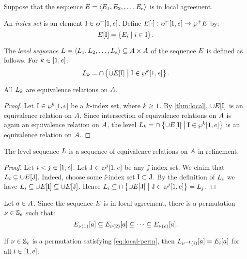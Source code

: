 Suppose that the sequence
$E = \left\langle E_{1}, E_{2}, \dots, E_{e} \right\rangle$ is in local agreement.
\begin{definition}
An \emph{index set} is an element $\mathrm{I} \in \wp^{+}{[}1, e]$.
Define $E[\cdot] : \wp^{+}{[}1, e] \to \wp^{+}{E}$ by:
\[
  E[\mathrm{I}] = \left\{E_{i}\mathrel{}\middle|\mathrel{}i \in \mathrm{I}\right\}.
\]

The \emph{level sequence} $L = \left\langle L_{1},L_{2},\dots,L_{e} \right\rangle
\subseteq {A\times A}$ of the sequence $E$ is defined as follows.
For $k \in [1, e]$:
\[
  L_{k} = \cap \left\{\cup E[\mathrm{I}]\mathrel{}\middle|\mathrel{}\mathrm{I} \in \wp^{k}{[}1, e]\right\}.
\]
\end{definition}
\begin{remark}
All $L_{k}$ are equivalence relations on $A$.
\end{remark}
\begin{proof}
Let $\mathrm{I} \in \wp^{k}{[}1,e]$ be a $k$-index set, where $k \geq 1$.
By \cref{thm:local}, $\cup E[\mathrm{I}]$ is an equivalence relation on
$A$.
Since intersection of equivalence relations on $A$ is again an equivalence 
relation on $A$, the level
$L_{k} = \cap \left\{\cup E[\mathrm{I}]\mathrel{}\middle|\mathrel{}\mathrm{I} \in \wp^{k}{[}1,e]\right\}$
is an equivalence relation on $A$.
\end{proof}
\begin{remark}\label{rem:local-lvl-refine}
The level sequence $L$ is a sequence of equivalence relations on $A$ in
refinement.
\end{remark}
\begin{proof}
Let $i < j \in [1, e]$.
Let $\mathrm{J} \in \wp^{j}{[}1, e]$ be any $\jj$-index set.
We claim that $L_{i} \subseteq \cup E[\mathrm{J}]$.
Indeed, choose some $\ii$-index set $\mathrm{I} \subset \mathrm{J}$.
By the definition of $L_{i}$ we have
$L_{i} \subseteq \cup E[\mathrm{I}] \subseteq \cup E[\mathrm{J}]$.
Hence
$L_{i} \subseteq \cap \left\{\cup E[\mathrm{J}]\mathrel{}\middle|\mathrel{}\mathrm{J} \in \wp^{j}{[}1,e]\right\}
= L_{j}$.
\end{proof}
Let $a \in A$. Since the sequence $E$ is in local agreement, there is
a permutation $\nu \in \mathbb{S}_{e}$ such that:
\begin{equation}\label{eq:local-perm}
  E_{\nu(1)}[a] \subseteq
  E_{\nu(2)}[a] \subseteq
  \dots \subseteq
  E_{\nu(e)}[a].
\end{equation}
\begin{lemma}\label{lem:local-lvl-perm}
If $\nu \in \mathbb{S}_{e}$ is a permutation satisfying \cref{eq:local-perm},
then $L_{\nu^{-1}(i)}[a] = E_{i}[a]$ for all $i \in [1,e]$.
\end{lemma}

